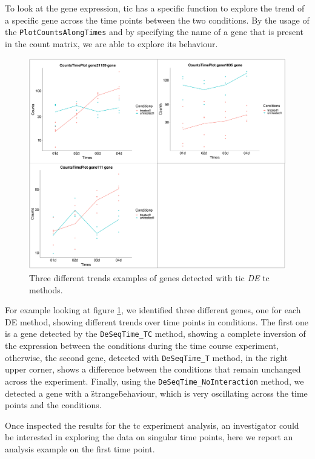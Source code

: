 To look at the gene expression, \gls{tic} has a specific function to explore the trend of a specific gene across the time points between the two conditions. 
By the usage of the \lstinline!PlotCountsAlongTimes! and by specifying the name of a gene that is present in the count matrix, we are able to explore its behaviour.

\begin{figure}[H]
\includegraphics[width=\textwidth,keepaspectratio]{img/ticorser/de/trends/trends.pdf}
\caption[ticorser genes trends]{Three different trends examples of genes detected with \gls{tic} \textit{DE} \gls{tc} methods.}
\label{fig:ticorsertrends}
\centering
\end{figure}

For example looking at figure \ref{fig:ticorsertrends}, we identified three different genes, one for each DE method, showing different trends over time points in conditions.
The first one is a gene detected by the \lstinline!DeSeqTime_TC! method, showing a complete inversion of the expression between the conditions during the time course experiment, otherwise, the second gene, detected with \lstinline!DeSeqTime_T! method, in the right upper corner, shows a difference between the conditions that remain unchanged across the experiment.
Finally, using the \lstinline!DeSeqTime_NoInteraction! method, we detected a gene with a \"strange\" behaviour, which is very oscillating across the time points and the conditions. 

Once inspected the results for the \gls{tc} experiment analysis, an investigator could be interested in exploring the data on singular time points, here we report an analysis example on the first time point.

